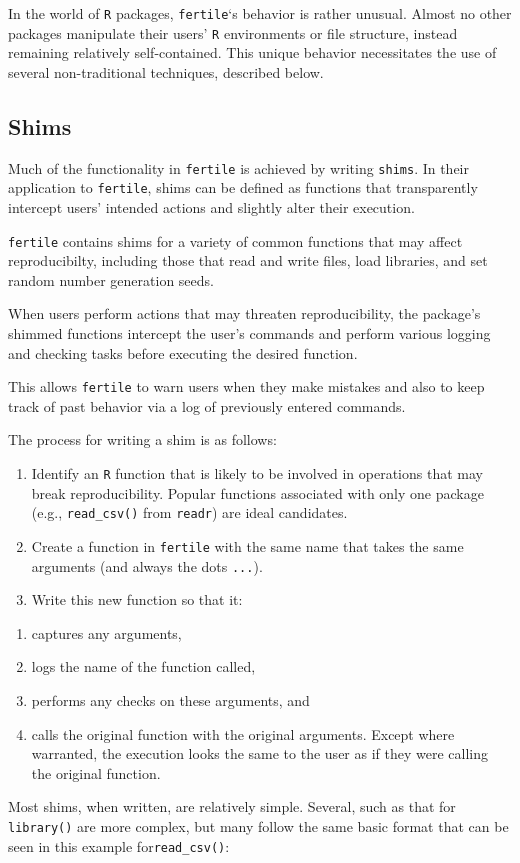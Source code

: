 \documentclass[12pt,twoside]{reedthesis}
\providecommand{\tightlist}{%
  \setlength{\itemsep}{0pt}\setlength{\parskip}{0pt}}
\begin{document}
In the world of \texttt{R} packages, \texttt{fertile}`s behavior is
rather unusual. Almost no other packages manipulate their users'
\texttt{R} environments or file structure, instead remaining relatively
self-contained. This unique behavior necessitates the use of several
non-traditional techniques, described below.

\subsection{Shims}\label{shims}

Much of the functionality in \texttt{fertile} is achieved by writing
\texttt{shims}. In their application to \texttt{fertile}, shims can be
defined as functions that transparently intercept users' intended
actions and slightly alter their execution.

\texttt{fertile} contains shims for a variety of common functions that
may affect reproducibilty, including those that read and write files,
load libraries, and set random number generation seeds.

When users perform actions that may threaten reproducibility, the
package's shimmed functions intercept the user's commands and perform
various logging and checking tasks before executing the desired
function.

This allows \texttt{fertile} to warn users when they make mistakes and
also to keep track of past behavior via a log of previously entered
commands.

The process for writing a shim is as follows:
\begin{enumerate}
\def\labelenumi{\arabic{enumi}.}
\item
  Identify an \texttt{R} function that is likely to be involved in
  operations that may break reproducibility. Popular functions
  associated with only one package (e.g., \texttt{read\_csv()} from
  \texttt{readr}) are ideal candidates.
\item
  Create a function in \texttt{fertile} with the same name that takes
  the same arguments (and always the dots \texttt{...}).
\item
  Write this new function so that it:
\end{enumerate}
\begin{enumerate}
\def\labelenumi{\alph{enumi})}
\tightlist
\item
  captures any arguments,
\item
  logs the name of the function called,
\item
  performs any checks on these arguments, and
\item
  calls the original function with the original arguments. Except where
  warranted, the execution looks the same to the user as if they were
  calling the original function.
\end{enumerate}
Most shims, when written, are relatively simple. Several, such as that
for \texttt{library()} are more complex, but many follow the same basic
format that can be seen in this example for\texttt{read\_csv()}:
\end{document}
